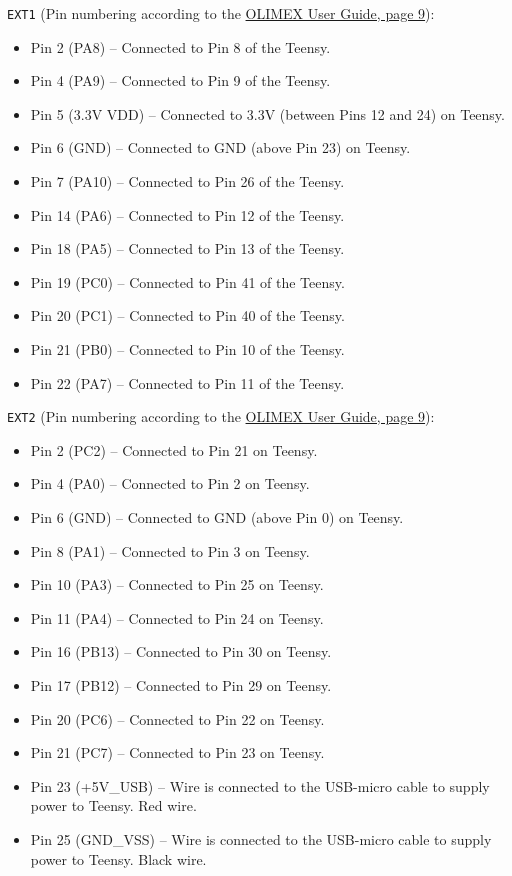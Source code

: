 \verb|EXT1| (Pin numbering according to the \href{https://www.olimex.com/Products/ARM/ST/STM32-H405/resources/STM32-H405_UM.pdf}{OLIMEX User Guide, page 9}):
\begin{itemize}[noitemsep]
  \item Pin 2 (PA8) -- Connected to Pin 8 of the Teensy.
  \item Pin 4 (PA9) -- Connected to Pin 9 of the Teensy.
  \item Pin 5 (3.3V VDD) -- Connected to 3.3V (between Pins 12 and 24) on Teensy.
  \item Pin 6 (GND) -- Connected to GND (above Pin 23) on Teensy.
  \item Pin 7 (PA10) -- Connected to Pin 26 of the Teensy.
  \item Pin 14 (PA6) -- Connected to Pin 12 of the Teensy.
  \item Pin 18 (PA5) -- Connected to Pin 13 of the Teensy.
  \item Pin 19 (PC0) -- Connected to Pin 41 of the Teensy.
  \item Pin 20 (PC1) -- Connected to Pin 40 of the Teensy.
  \item Pin 21 (PB0) -- Connected to Pin 10 of the Teensy.
  \item Pin 22 (PA7) -- Connected to Pin 11 of the Teensy.
\end{itemize}

\verb|EXT2| (Pin numbering according to the \href{https://www.olimex.com/Products/ARM/ST/STM32-H405/resources/STM32-H405_UM.pdf}{OLIMEX User Guide, page 9}):
\begin{itemize}[noitemsep]
  \item Pin 2 (PC2) -- Connected to Pin 21 on Teensy.
  \item Pin 4 (PA0) -- Connected to Pin 2 on Teensy.
  \item Pin 6 (GND) -- Connected to GND (above Pin 0) on Teensy.
  \item Pin 8 (PA1) -- Connected to Pin 3 on Teensy.
  \item Pin 10 (PA3) -- Connected to Pin 25 on Teensy.
  \item Pin 11 (PA4) -- Connected to Pin 24 on Teensy.
  \item Pin 16 (PB13) -- Connected to Pin 30 on Teensy.
  \item Pin 17 (PB12) -- Connected to Pin 29 on Teensy.
  \item Pin 20 (PC6) -- Connected to Pin 22 on Teensy.
  \item Pin 21 (PC7) -- Connected to Pin 23 on Teensy.
  \item Pin 23 (+5V\_USB) -- Wire is connected to the USB-micro cable to supply power to Teensy. Red wire.
  \item Pin 25 (GND\_VSS) -- Wire is connected to the USB-micro cable to supply power to Teensy. Black wire.
\end{itemize}


